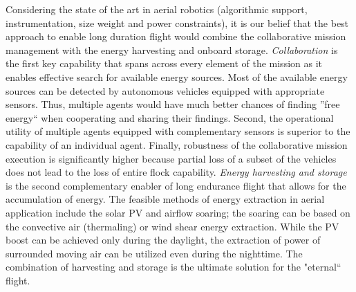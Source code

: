 \documentclass{ifacconf}
\begin{document}
%

Considering the state of the art in aerial robotics (algorithmic support,
instrumentation, size weight and power constraints), it is our belief that
the best approach to enable long duration flight would combine the
collaborative mission management with the energy harvesting and onboard
storage. \emph{Collaboration} is the first key capability that spans across
every element of the mission as it enables effective search for available
energy sources. Most of the available energy sources can be detected by
autonomous vehicles equipped with appropriate sensors. Thus, multiple agents
would have much better chances of finding ''free energy`` when cooperating
and sharing their findings. Second, the operational utility of multiple
agents equipped with complementary sensors is superior to the capability of
an individual agent. Finally, robustness of the collaborative mission
execution is significantly higher because partial loss of a subset of the
vehicles does not lead to the loss of entire flock capability. \emph{Energy
harvesting and storage} is the second complementary enabler of long endurance
flight that allows for the accumulation of energy. The feasible methods of
energy extraction in aerial application include the solar PV and airflow
soaring; the soaring can be based on the convective air (thermaling) or wind
shear energy extraction. While the PV boost can be achieved only during the
daylight, the extraction of power of surrounded moving air can be utilized
even during the nighttime. The combination of harvesting and storage is the
ultimate solution for the "eternal`` flight.
\end{document}
